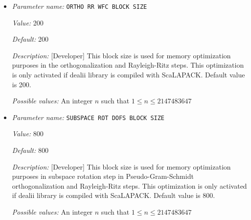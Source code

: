 \begin{itemize}
{\it Possible values:} An integer $n$ such that $0\leq n \leq 300$
\item {\it Parameter name:} {\tt ORTHO RR WFC BLOCK SIZE}
\label{parameters:SCF parameters/Eigen_2dsolver_2fChebyshev solver related parameters/ORTHO RR WFC BLOCK SIZE}
\label{parameters:SCF_20parameters/Eigen_2dsolver_2fChebyshev_20solver_20related_20parameters/ORTHO_20RR_20WFC_20BLOCK_20SIZE}


{\it Value:} 200


{\it Default:} 200


{\it Description:} [Developer] This block size is used for memory optimization purposes in the orthogonalization and Rayleigh-Ritz steps. This optimization is only activated if dealii library is compiled with ScaLAPACK. Default value is 200.


{\it Possible values:} An integer $n$ such that $1\leq n \leq 2147483647$
\item {\it Parameter name:} {\tt SUBSPACE ROT DOFS BLOCK SIZE}
\label{parameters:SCF parameters/Eigen_2dsolver_2fChebyshev solver related parameters/SUBSPACE ROT DOFS BLOCK SIZE}
\label{parameters:SCF_20parameters/Eigen_2dsolver_2fChebyshev_20solver_20related_20parameters/SUBSPACE_20ROT_20DOFS_20BLOCK_20SIZE}


{\it Value:} 800


{\it Default:} 800


{\it Description:} [Developer] This block size is used for memory optimization purposes in subspace rotation step in Pseudo-Gram-Schmidt orthogonalization and Rayleigh-Ritz steps. This optimization is only activated if dealii library is compiled with ScaLAPACK. Default value is 800.


{\it Possible values:} An integer $n$ such that $1\leq n \leq 2147483647$
\end{itemize}
